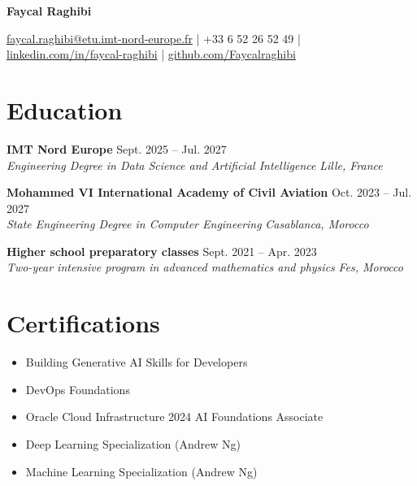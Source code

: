 \documentclass[11pt,a4paper]{article}
\newcommand{\resumeSubheading}[4]{
  \vspace{3pt}
  \noindent\textbf{#1} \hfill #2 \\
  \textit{#3} \hfill \textit{#4}
  \vspace{2pt}
}
\begin{document}
\begin{center}
{\LARGE \textbf{Faycal Raghibi}}

\vspace{2pt}
\href{mailto:faycal.raghibi@etu.imt-nord-europe.fr}{faycal.raghibi@etu.imt-nord-europe.fr} | +33 6 52 26 52 49 | \href{https://linkedin.com/in/faycal-raghibi}{linkedin.com/in/faycal-raghibi} | \href{https://github.com/Faycalraghibi}{github.com/Faycalraghibi}
\end{center}

\section{Education}
\resumeSubheading{IMT Nord Europe}{Sept. 2025 -- Jul. 2027}{Engineering Degree in Data Science and Artificial Intelligence}{Lille, France}
\resumeSubheading{Mohammed VI International Academy of Civil Aviation}{Oct. 2023 -- Jul. 2027}{State Engineering Degree in Computer Engineering}{Casablanca, Morocco}
\resumeSubheading{Higher school preparatory classes}{Sept. 2021 -- Apr. 2023}{Two-year intensive program in advanced mathematics and physics}{Fes, Morocco}

\section{Certifications}
\begin{itemize}
  \item Building Generative AI Skills for Developers
  \item DevOps Foundations
  \item Oracle Cloud Infrastructure 2024 AI Foundations Associate
  \item Deep Learning Specialization (Andrew Ng)
  \item Machine Learning Specialization (Andrew Ng)
\end{itemize}
\end{document}
